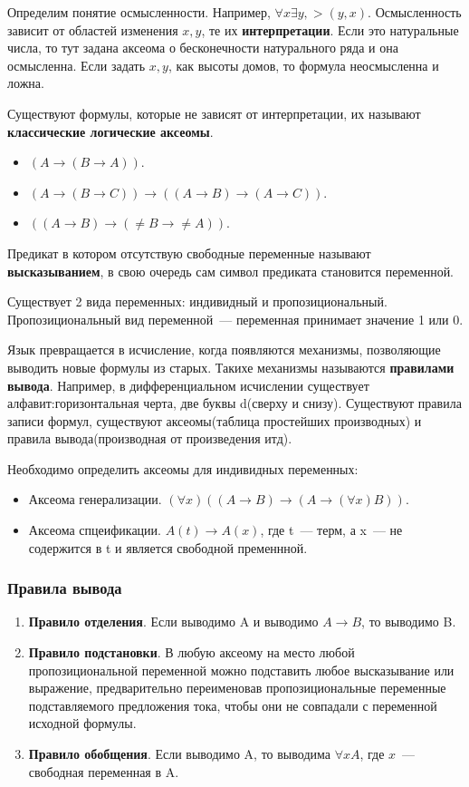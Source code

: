 Определим понятие осмысленности. Например, $\forall{}x\exists{}y, >(y,x)$. Осмысленность зависит от областей изменения $x,y$, те их \textbf{интерпретации}. Если это натуральные числа, то тут задана аксеома о бесконечности натурального ряда и она осмысленна. Если задать $x,y$, как высоты домов, то формула неосмысленна и ложна.


Существуют формулы, которые не зависят от интерпретации, их называют \textbf{классические логические аксеомы}. 
\begin{itemize}
	\item $(A\rightarrow{}(B\rightarrow{}A))$.
	\item $(A\rightarrow{}(B\rightarrow{}C))\rightarrow((A\rightarrow{}B)\rightarrow(A\rightarrow{}C))$.
	\item $((A\rightarrow{}B)\rightarrow(\neq{}B\rightarrow{}\neq{}A))$.
\end{itemize}

Предикат в котором отсутствую свободные переменные называют \textbf{высказыванием}, в свою очередь сам символ предиката становится переменной. 

Существует 2 вида переменных: индивидный и пропозициональный. Пропозициональный вид переменной~--- переменная принимает значение 1 или 0.

Язык превращается в исчисление, когда появляются механизмы, позволяющие выводить новые формулы из старых. Такихе механизмы называются \textbf{правилами вывода}. Например, в дифференциальном исчислении существует алфавит:горизонтальная черта, две буквы d(сверху и снизу). Существуют правила записи формул, существуют аксеомы(таблица простейших производных) и правила вывода(производная от произведения итд).

Необходимо определить аксеомы для индивидных переменных:
\begin{itemize}
	\item Аксеома генерализации. $(\forall{}x)((A\rightarrow{}B)\rightarrow(A\rightarrow(\forall{}x)B))$.
	\item Аксеома спцеификации. $A(t)\rightarrow{}A(x)$, где t~--- терм, а x~--- не содержится в t и является свободной пременнной.
\end{itemize}

\subsubsection{Правила вывода}
\begin{enumerate}
	\item \textbf{Правило отделения}. Если выводимо A и выводимо $A\rightarrow{}B$, то выводимо B.
	\item \textbf{Правило подстановки}. В любую аксеому на место любой пропозициональной переменной можно подставить любое высказывание или выражение, предварительно переименовав пропозициональные переменные подставляемого предложения тока, чтобы они не совпадали с переменной исходной формулы.
	\item \textbf{Правило обобщения}. Если выводимо A, то выводима $\forall{}xA$, где $x$~--- свободная переменная в A.
\end{enumerate}

